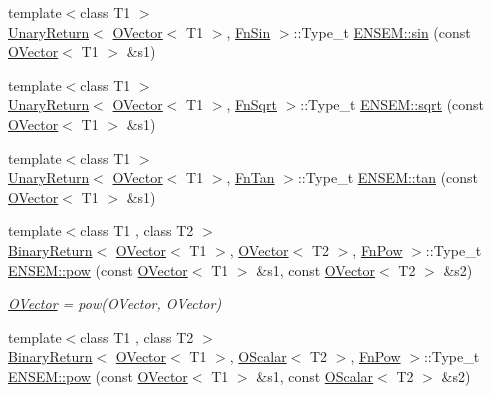 \begin{DoxyCompactItemize}
\item 
{\footnotesize template$<$class T1 $>$ }\\\mbox{\hyperlink{structENSEM_1_1UnaryReturn}{Unary\+Return}}$<$ \mbox{\hyperlink{classENSEM_1_1OVector}{O\+Vector}}$<$ T1 $>$, \mbox{\hyperlink{structENSEM_1_1FnSin}{Fn\+Sin}} $>$\+::Type\+\_\+t \mbox{\hyperlink{group__obsvector_ga3731f97921228d0d2c0ad3d05aa88985}{E\+N\+S\+E\+M\+::sin}} (const \mbox{\hyperlink{classENSEM_1_1OVector}{O\+Vector}}$<$ T1 $>$ \&s1)
\item 
{\footnotesize template$<$class T1 $>$ }\\\mbox{\hyperlink{structENSEM_1_1UnaryReturn}{Unary\+Return}}$<$ \mbox{\hyperlink{classENSEM_1_1OVector}{O\+Vector}}$<$ T1 $>$, \mbox{\hyperlink{structENSEM_1_1FnSqrt}{Fn\+Sqrt}} $>$\+::Type\+\_\+t \mbox{\hyperlink{group__obsvector_gaf293f21cc7c65ebe881f87d5214c0e60}{E\+N\+S\+E\+M\+::sqrt}} (const \mbox{\hyperlink{classENSEM_1_1OVector}{O\+Vector}}$<$ T1 $>$ \&s1)
\item 
{\footnotesize template$<$class T1 $>$ }\\\mbox{\hyperlink{structENSEM_1_1UnaryReturn}{Unary\+Return}}$<$ \mbox{\hyperlink{classENSEM_1_1OVector}{O\+Vector}}$<$ T1 $>$, \mbox{\hyperlink{structENSEM_1_1FnTan}{Fn\+Tan}} $>$\+::Type\+\_\+t \mbox{\hyperlink{group__obsvector_gaf380b1c371f0b85fa8b4f4e207fa15de}{E\+N\+S\+E\+M\+::tan}} (const \mbox{\hyperlink{classENSEM_1_1OVector}{O\+Vector}}$<$ T1 $>$ \&s1)
\item 
{\footnotesize template$<$class T1 , class T2 $>$ }\\\mbox{\hyperlink{structENSEM_1_1BinaryReturn}{Binary\+Return}}$<$ \mbox{\hyperlink{classENSEM_1_1OVector}{O\+Vector}}$<$ T1 $>$, \mbox{\hyperlink{classENSEM_1_1OVector}{O\+Vector}}$<$ T2 $>$, \mbox{\hyperlink{structENSEM_1_1FnPow}{Fn\+Pow}} $>$\+::Type\+\_\+t \mbox{\hyperlink{group__obsvector_ga48ab93692ad432295c8498d12a368861}{E\+N\+S\+E\+M\+::pow}} (const \mbox{\hyperlink{classENSEM_1_1OVector}{O\+Vector}}$<$ T1 $>$ \&s1, const \mbox{\hyperlink{classENSEM_1_1OVector}{O\+Vector}}$<$ T2 $>$ \&s2)
\begin{DoxyCompactList}\small\item\em \mbox{\hyperlink{classENSEM_1_1OVector}{O\+Vector}} = pow(\+O\+Vector, O\+Vector) \end{DoxyCompactList}\item 
{\footnotesize template$<$class T1 , class T2 $>$ }\\\mbox{\hyperlink{structENSEM_1_1BinaryReturn}{Binary\+Return}}$<$ \mbox{\hyperlink{classENSEM_1_1OVector}{O\+Vector}}$<$ T1 $>$, \mbox{\hyperlink{classENSEM_1_1OScalar}{O\+Scalar}}$<$ T2 $>$, \mbox{\hyperlink{structENSEM_1_1FnPow}{Fn\+Pow}} $>$\+::Type\+\_\+t \mbox{\hyperlink{group__obsvector_gacd9051c476ef11d6697002aa2b6ecd7c}{E\+N\+S\+E\+M\+::pow}} (const \mbox{\hyperlink{classENSEM_1_1OVector}{O\+Vector}}$<$ T1 $>$ \&s1, const \mbox{\hyperlink{classENSEM_1_1OScalar}{O\+Scalar}}$<$ T2 $>$ \&s2)

\end{DoxyCompactItemize}
